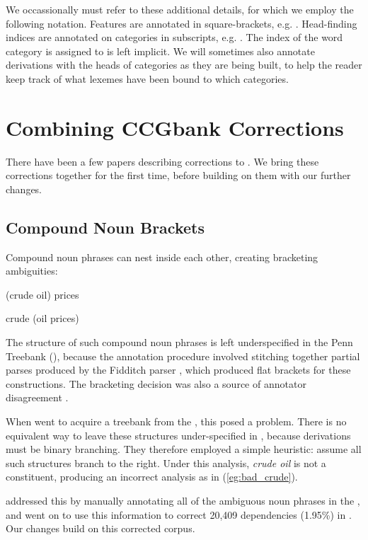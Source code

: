 \documentclass[11pt]{article}
\begin{document}
We occassionally must refer to these additional details, for which we employ
the following notation. Features are annotated in square-brackets, e.g.
. Head-finding indices are annotated on categories in
 subscripts, e.g. . The index of the word category
is assigned to is left implicit. We will sometimes
also annotate derivations with the heads of categories as they are being built, to help
the reader keep track of what lexemes have been bound to which categories.

\section{Combining CCGbank Corrections}
\label{sec:prev_corr}
There have been a few papers describing corrections to \ccgbank.
We bring these corrections
together for the first time, before building on them with our further changes.

\subsection{Compound Noun Brackets}

Compound noun phrases can nest inside each other, creating bracketing
ambiguities:

\begin{lexamples}
 \item (crude oil) prices\label{eg:bad_crude}
 \item crude (oil prices)
\end{lexamples}

The structure of such compound noun phrases is left underspecified in the Penn
Treebank (\penn), because the annotation procedure involved stitching together
partial parses produced by the Fidditch parser \citep{hindle:83}, which
produced flat brackets for these constructions. The bracketing
decision was also a source of annotator disagreement \citep{bies:95}.

When \citet{hock:lrec02} went to acquire a \ccg treebank from the \penn, this
posed a problem. There is no equivalent way to leave these structures
under-specified in \ccg, because derivations must be binary branching. They
therefore employed a simple heuristic: assume all such structures branch to
the right. Under this analysis, \emph{crude oil} is not a constituent,
producing an incorrect analysis as in (\ref{eg:bad_crude}).

\citet{vadas:07} addressed this by manually annotating all of the ambiguous
noun phrases in the \penn, and went on to use this information to correct 20,409
dependencies (1.95\%) in \ccgbank \citep{vadas:08}. Our changes build on this
corrected corpus.
\end{document}
